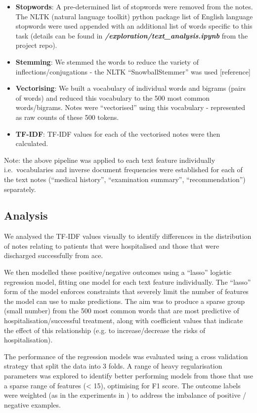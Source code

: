    \begin{itemize}
       \item \textbf{Stopwords}: A pre-determined list of stopwords were removed from the notes. The NLTK (natural language toolkit) python package \cite{nltk} list of English language stopwords were used appended with an additional list of words specific to this task (details can be found in \textbf{\textit{/exploration/text\_analysis.ipynb}} from the project repo).
       \item \textbf{Stemming}: We stemmed the words to reduce the variety of inflections/conjugations - the NLTK ``SnowballStemmer'' was used [reference]
       \item \textbf{Vectorising}: We built a vocabulary of individual words and bigrams (pairs of words) and reduced this vocabulary to the 500 most common words/bigrams. Notes were ``vectorised'' using this vocabulary - represented as raw counts of these 500 tokens.
       \item \textbf{TF-IDF}: TF-IDF values for each of the vectorised notes were then calculated.
   \end{itemize}

   Note: the above pipeline was applied to each text feature individually i.e.\ vocabularies and inverse document frequencies were established for each of the text notes (``medical history'', ``examination summary'', ``recommendation'') separately.

   \subsection{Analysis}\label{subsec:analysis}

   We analysed the TF-IDF values visually to identify differences in the distribution of notes relating to patients that were hospitalised and those that were discharged successfully from ace.

   We then modelled these positive/negative outcomes using a ``lasso'' logistic regression model, fitting one model for each text feature individually. The ``lasso'' form of the model enforces constraints that severely limit the number of features the model can use to make predictions. The aim was to produce a sparse group (small number) from the 500 most common words that are most predictive of hospitalisation/successful treatment, along with coefficient values that indicate the effect of this relationship (e.g. to increase/decrease the risks of hospitalisation).

  The performance of the regression models was evaluated using a cross validation strategy that split the data into 3 folds. A range of heavy regularisation parameters was explored to identify better performing models from those that use a sparse range of features (< 15), optimising for F1 score. The outcome labels were weighted (as in the experiments in ) to address the imbalance of positive / negative examples.

